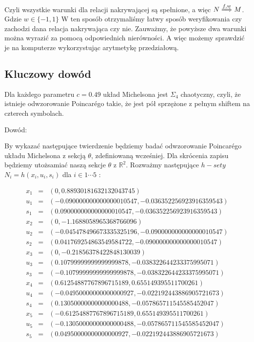 Czyli wszystkie warunki dla relacji nakrywającej są spełnione, a więc $N \stackrel{f,w}{\Longrightarrow} M $. Gdzie $ w \in \{-1,1\} $ 
W ten sposób otrzymaliśmy łatwy sposób weryfikowania czy zachodzi dana relacja nakrywająca czy nie. Zauważmy, że powyższe dwa 
warunki można wyrazić za pomocą odpowiednich nierówności. A więc możemy sprawdzić je na komputerze wykorzystując arytmetykę przedziałową.

\subsection{Kluczowy dowód}

\begin{theorem}
  Dla każdego parametru $ c = 0.49 $ układ Michelsona jest $ \Sigma_4 $ chaotyczny,
  czyli, że istnieje odwzorowanie Poincar\'ego takie, że jest pół sprzężone z pełnym shiftem na czterech symbolach.
\end{theorem}

Dowód:

By wykazać następujące twierdzenie będziemy badać odwzorowanie Poincar\'ego układu Michelsona z sekcją $ \theta $, zdefiniowaną wcześniej.
Dla skrócenia zapisu będziemy utożsamiać naszą sekcje $ \theta $ z $ \mathbb R^2 $.
Rozważmy następujące $ h-sety $ $ N_i = h(x_i,u_i,s_i) $ dla $ i \in 1 \cdots 5 $ :

\begin{eqnarray*}
 x_1 & = &(0,0.88930181632132043745) \\  u_1 & = & (-0.090000000000000010547,-0.036352256923916359543) \\
 s_1 & = & (0.090000000000000010547,-0.036352256923916359543) \\
 x_2 & = & (0,-1.1688058965368766096) \\ u_2 & = &(-0.045478496673335325196,-0.090000000000000010547) \\
 s_2 & = &(0.041769254863549584722,-0.090000000000000010547) \\
 x_3 & = & (0,-0.21856378422848130039)\\  u_3 & = & (0.10799999999999999878,-0.038322644233375995071) \\
 s_3 & = &(-0.10799999999999999878,-0.038322644233375995071) \\
 x_4 & = & (0.61254887767896715189,0.655149395511700261) \\ u_4 & = & (-0.04950000000000000927,-0.022192443886905721673) \\
 s_4 & = & (0.13050000000000000488,-0.057865711545585452047) \\
 x_5 & = & (-0.61254887767896715189,0.655149395511700261)  \\ u_5 & = & (-0.13050000000000000488,-0.057865711545585452047) \\
 s_5 & = & (0.04950000000000000927,-0.022192443886905721673) \\
\end{eqnarray*}

